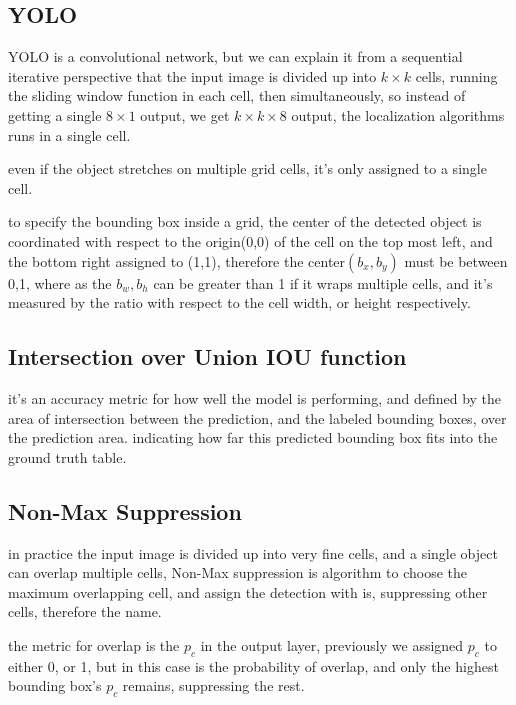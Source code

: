 \documentclass[4apaper,12pt]{book}
\begin{document}
\begin{description}
        \subsection{YOLO}
        \begin{description}
        \item YOLO is a convolutional network, but we can explain it from a sequential iterative perspective that the input image is divided up into $k\times{k}$ cells, running the sliding window function in each cell, then simultaneously, so instead of getting a single $8\times{1}$ output, we get $k\times{k}\times{8}$ output, the localization algorithms runs in a single cell.
        \item even if the object stretches on multiple grid cells, it's only assigned to a single cell.
        \item to specify the bounding box inside a grid, the center of the detected object is coordinated with respect to the origin(0,0) of the cell on the top most left, and the bottom right assigned to (1,1), therefore the center$(b_x,b_y)$ must be between 0,1, where as the $b_w,b_h$ can be greater than 1 if it wraps multiple cells, and it's measured by the ratio with respect to the cell width, or height respectively.
        \end{description}
        \subsection{Intersection over Union IOU function}
        \begin{description}
          \item it's an accuracy metric for how well the model is performing, and defined by the area of intersection between the prediction, and the labeled bounding boxes, over the prediction area. indicating how far this predicted bounding box fits into the ground truth table.
        \end{description}
        \subsection{Non-Max Suppression}
        \begin{description}
        \item in practice the input image is divided up into very fine cells, and a single object can overlap multiple cells, Non-Max suppression is algorithm to choose the maximum overlapping cell, and assign the detection with is, suppressing other cells, therefore the name.
        \item the metric for overlap is the $p_c$ in the output layer, previously we assigned $p_c$ to either 0, or 1, but in this case is the probability of overlap, and only the highest bounding box's $p_c$ remains, suppressing the rest.
        \end{description}

\end{description}
\end{document}

